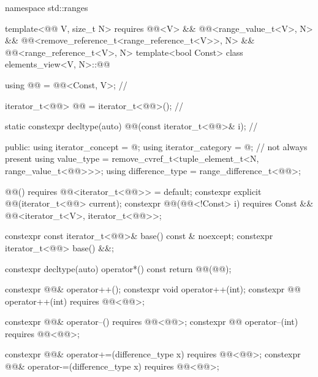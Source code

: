 \begin{codeblock}
namespace std::ranges {
  template<@@ V, size_t N>
    requires @@<V> && @@<range_value_t<V>, N> &&
             @@<remove_reference_t<range_reference_t<V>>, N> &&
             @@<range_reference_t<V>, N>
  template<bool Const>
  class elements_view<V, N>::@@ {
    using @@ = @@<Const, V>;                 // \expos

    iterator_t<@@> @@ = iterator_t<@@>();     // \expos

    static constexpr decltype(auto) @@(const iterator_t<@@>& i);     // \expos

  public:
    using iterator_concept = @\seebelow@;
    using iterator_category = @\seebelow@;                // not always present
    using value_type = remove_cvref_t<tuple_element_t<N, range_value_t<@@>>>;
    using difference_type = range_difference_t<@@>;

    @@() requires @@<iterator_t<@@>> = default;
    constexpr explicit @@(iterator_t<@@> current);
    constexpr @@(@@<!Const> i)
      requires Const && @@<iterator_t<V>, iterator_t<@@>>;

    constexpr const iterator_t<@@>& base() const & noexcept;
    constexpr iterator_t<@@> base() &&;

    constexpr decltype(auto) operator*() const
    { return @@(@@); }

    constexpr @@& operator++();
    constexpr void operator++(int);
    constexpr @@ operator++(int) requires @@<@@>;

    constexpr @@& operator--() requires @@<@@>;
    constexpr @@ operator--(int) requires @@<@@>;

    constexpr @@& operator+=(difference_type x)
      requires @@<@@>;
    constexpr @@& operator-=(difference_type x)
      requires @@<@@>;

}}
\end{codeblock}
